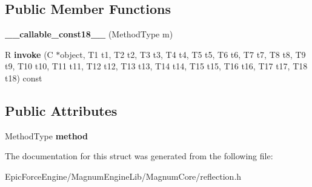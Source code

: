 \subsection*{Public Member Functions}
\begin{DoxyCompactItemize}
\item 
{\bfseries \+\_\+\+\_\+callable\+\_\+const18\+\_\+\+\_\+} (Method\+Type m)\hypertarget{structagm_1_1reflection_1_1____callable__const18_____a2a35f9ac329c8dbef73560d4a37d6c5b}{}\label{structagm_1_1reflection_1_1____callable__const18_____a2a35f9ac329c8dbef73560d4a37d6c5b}

\item 
R {\bfseries invoke} (C $\ast$object, T1 t1, T2 t2, T3 t3, T4 t4, T5 t5, T6 t6, T7 t7, T8 t8, T9 t9, T10 t10, T11 t11, T12 t12, T13 t13, T14 t14, T15 t15, T16 t16, T17 t17, T18 t18) const \hypertarget{structagm_1_1reflection_1_1____callable__const18_____a9376698840de932e9be5df83b66d1c4c}{}\label{structagm_1_1reflection_1_1____callable__const18_____a9376698840de932e9be5df83b66d1c4c}

\end{DoxyCompactItemize}
\subsection*{Public Attributes}
\begin{DoxyCompactItemize}
\item 
Method\+Type {\bfseries method}\hypertarget{structagm_1_1reflection_1_1____callable__const18_____af694f01975b40a2aeae47036b876fe78}{}\label{structagm_1_1reflection_1_1____callable__const18_____af694f01975b40a2aeae47036b876fe78}

\end{DoxyCompactItemize}


The documentation for this struct was generated from the following file\+:\begin{DoxyCompactItemize}
\item 
Epic\+Force\+Engine/\+Magnum\+Engine\+Lib/\+Magnum\+Core/reflection.\+h\end{DoxyCompactItemize}
